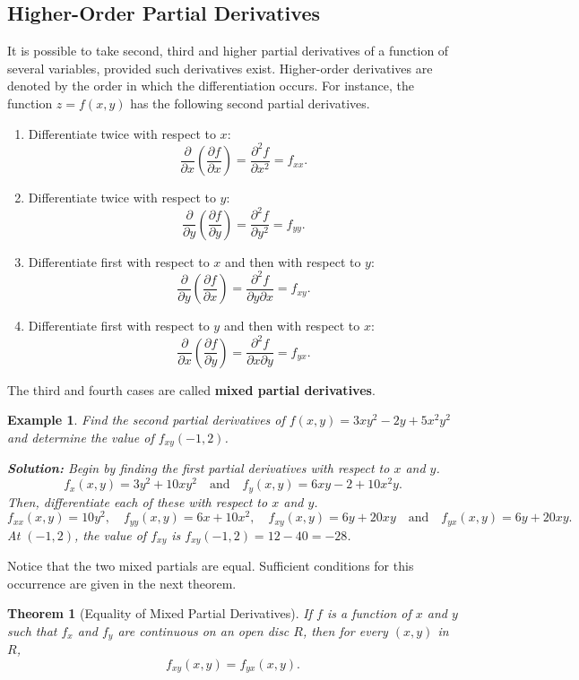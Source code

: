 \documentclass[titlepage,a4paper,12pt]{report}
\newtheorem{example}{Example}[section]
\newtheorem{theorem}{Theorem}[section]
\begin{document}
\subsection{Higher-Order Partial Derivatives}
It is possible to take second, third and higher partial derivatives of a function of several variables, provided such derivatives exist. Higher-order derivatives are denoted by the order in which the differentiation occurs. For instance, the function $z=f(x,y)$ has the following second partial derivatives.
\begin{enumerate}
\item Differentiate twice with respect to $x$:
\[\dfrac{\partial}{\partial x}\left(\dfrac{\partial f}{\partial x}\right) =\dfrac{\partial ^2 f}{\partial x^2}=f_{xx}.\]
\item Differentiate twice with respect to $y$:
\[\dfrac{\partial}{\partial y}\left(\dfrac{\partial f}{\partial y}\right) =\dfrac{\partial ^2 f}{\partial y^2}=f_{yy}.\]
\item Differentiate first with respect to $x$ and then with respect to $y$:
\[\dfrac{\partial}{\partial y}\left(\dfrac{\partial f}{\partial x}\right) =\dfrac{\partial ^2 f}{\partial y \partial x}=f_{xy}.\]
\item Differentiate first with respect to $y$ and then with respect to $x$:
\[\dfrac{\partial}{\partial x}\left(\dfrac{\partial f}{\partial y}\right) =\dfrac{\partial ^2 f}{\partial x \partial y}=f_{yx}.\]
\end{enumerate}
The third and fourth cases are called \textbf{mixed partial derivatives}.
\begin{example}
Find the second partial derivatives of $f(x,y)=3xy^2-2y+5x^2y^2$ and determine the value of $f_{xy}(-1,2)$.

\noindent \textbf{Solution:} Begin by finding the first partial derivatives with respect to $x$ and $y$.
\[f_x(x,y)=3y^2+10xy^2 \quad \mbox{and}\quad f_y(x,y)=6xy-2+10x^2y.\]
Then, differentiate each of these with respect to $x$ and $y$.
\[f_{xx}(x,y)=10y^2, \quad f_{yy}(x,y)=6x+10x^2, \quad f_{xy}(x,y)=6y+20xy \quad \mbox{and} \quad f_{yx}(x,y)=6y+20xy.\] At $(-1,2)$, the value of $f_{xy}$ is $f_{xy}(-1,2)=12-40=-28$.
\end{example}
\noindent Notice that the two mixed partials are equal.  Sufficient conditions for this occurrence are given in the next theorem.
\begin{theorem}[Equality of Mixed Partial Derivatives]
If $f$ is a function of $x$ and $y$ such that $f_x$ and $f_y$ are continuous on an open disc $R$, then for every $(x,y)$ in $R$, 
\[f_{xy}(x,y)=f_{yx}(x,y).\]
\end{theorem}
\end{document}
